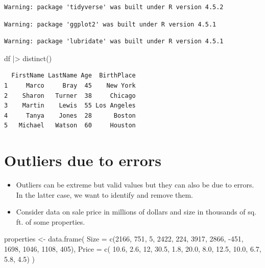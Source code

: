 \documentclass[
  letterpaper,
  DIV=11,
  numbers=noendperiod]{scrreprt}
\newenvironment{Shaded}{\begin{snugshade}}{\end{snugshade}}
\newcommand{\AttributeTok}[1]{\textcolor[rgb]{0.40,0.45,0.13}{#1}}
\newcommand{\DecValTok}[1]{\textcolor[rgb]{0.68,0.00,0.00}{#1}}
\newcommand{\FloatTok}[1]{\textcolor[rgb]{0.68,0.00,0.00}{#1}}
\newcommand{\FunctionTok}[1]{\textcolor[rgb]{0.28,0.35,0.67}{#1}}
\newcommand{\NormalTok}[1]{\textcolor[rgb]{0.00,0.23,0.31}{#1}}
\newcommand{\OtherTok}[1]{\textcolor[rgb]{0.00,0.23,0.31}{#1}}
\newcommand{\SpecialCharTok}[1]{\textcolor[rgb]{0.37,0.37,0.37}{#1}}
\begin{document}
\begin{verbatim}
Warning: package 'tidyverse' was built under R version 4.5.2
\end{verbatim}

\begin{verbatim}
Warning: package 'ggplot2' was built under R version 4.5.1
\end{verbatim}

\begin{verbatim}
Warning: package 'lubridate' was built under R version 4.5.1
\end{verbatim}

\begin{Shaded}
\begin{Highlighting}[]
\NormalTok{df }\SpecialCharTok{|\textgreater{}} \FunctionTok{distinct}\NormalTok{()}
\end{Highlighting}
\end{Shaded}

\begin{verbatim}
  FirstName LastName Age  BirthPlace
1     Marco     Bray  45    New York
2    Sharon   Turner  38     Chicago
3    Martin    Lewis  55 Los Angeles
4     Tanya    Jones  28      Boston
5   Michael   Watson  60     Houston
\end{verbatim}

\section{Outliers due to errors}\label{outliers-due-to-errors}

\begin{itemize}
\item
  Outliers can be extreme but valid values but they can also be due to
  errors. In the latter case, we want to identify and remove them.
\item
  Consider data on sale price in millions of dollars and size in
  thousands of sq. ft. of some properties.
\end{itemize}

\begin{Shaded}
\begin{Highlighting}[]
\NormalTok{properties }\OtherTok{\textless{}{-}} \FunctionTok{data.frame}\NormalTok{(}
  \AttributeTok{Size =} \FunctionTok{c}\NormalTok{(}\DecValTok{2166}\NormalTok{, }\DecValTok{751}\NormalTok{, }\DecValTok{5}\NormalTok{, }\DecValTok{2422}\NormalTok{, }\DecValTok{224}\NormalTok{, }\DecValTok{3917}\NormalTok{, }\DecValTok{2866}\NormalTok{, }\SpecialCharTok{{-}}\DecValTok{451}\NormalTok{, }\DecValTok{1698}\NormalTok{, }\DecValTok{1046}\NormalTok{, }\DecValTok{1108}\NormalTok{, }\DecValTok{405}\NormalTok{),}
  \AttributeTok{Price =} \FunctionTok{c}\NormalTok{(  }\FloatTok{10.6}\NormalTok{, }\FloatTok{2.6}\NormalTok{, }\DecValTok{12}\NormalTok{, }\FloatTok{30.5}\NormalTok{, }\FloatTok{1.8}\NormalTok{, }\FloatTok{20.0}\NormalTok{,  }\FloatTok{8.0}\NormalTok{, }\FloatTok{12.5}\NormalTok{, }\FloatTok{10.0}\NormalTok{,  }\FloatTok{6.7}\NormalTok{,  }\FloatTok{5.8}\NormalTok{, }\FloatTok{4.5}\NormalTok{)}
\NormalTok{)}
\end{Highlighting}
\end{Shaded}
\end{document}
